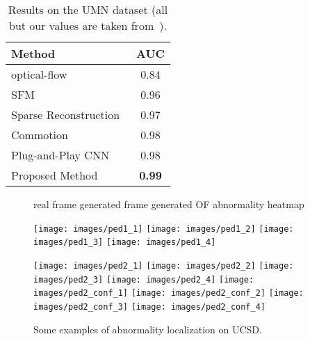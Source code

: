\documentclass{article}
\begin{document}
\begin{table}
		\begin{center}
			\begin{tabular}[width=0.75\textwidth]{l c}
				\toprule
				Method 										& 	AUC \\
				\midrule
				optical-flow~\cite{mehran2009abnormal}	    &	0.84 \\
				SFM~\cite{mehran2009abnormal} 				&	0.96\\
Sparse Reconstruction~\cite{cong2011sparse} &   0.97\\
				Commotion~\cite{mousavi2015crowd} 		    &	0.98\\
				Plug-and-Play CNN~\cite{ravanbakhsh2016plug}&	0.98\\
				Proposed Method 							&	\textbf{0.99}\\
				\bottomrule
				
			\end{tabular}
		\end{center}
		\caption{Results on the UMN dataset (all but our values are taken  from~\cite{mousavi2015crowd}).}
		\label{tbl:umn}
	\end{table}
	
\begin{figure}
		\begin{center}
			\scriptsize{\hspace{0.6cm}real frame  \hspace{0.7cm} generated frame \hspace{0.6cm} generated OF \hspace{0.3cm} abnormality heatmap}
			
			\texttt{[image: images/ped1\_1]}
			\texttt{[image: images/ped1\_2]}
			\texttt{[image: images/ped1\_3]}
			\texttt{[image: images/ped1\_4]}


			\texttt{[image: images/ped2\_1]}
			\texttt{[image: images/ped2\_2]}
			\texttt{[image: images/ped2\_3]}
			\texttt{[image: images/ped2\_4]}
\texttt{[image: images/ped2\_conf\_1]}
			\texttt{[image: images/ped2\_conf\_2]}
			\texttt{[image: images/ped2\_conf\_3]}
			\texttt{[image: images/ped2\_conf\_4]}
			
		\end{center}
		\caption{Some examples of abnormality localization on UCSD.}
		\label{fig:pedvis}
	\end{figure}
	
\end{document}
